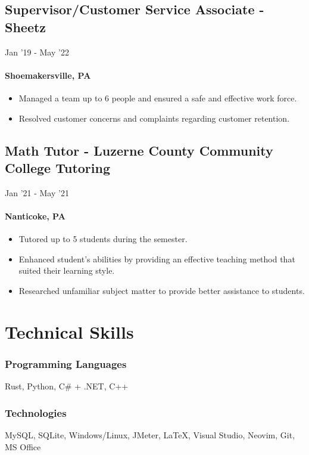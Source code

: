\documentclass{article}
\begin{document}
\subsection{Supervisor/Customer Service Associate - Sheetz} \hfill Jan '19 - May '22
\paragraph{Shoemakersville, PA}
\begin{itemize}
  \item Managed a team up to 6 people and ensured a safe and effective work force.
  \item Resolved customer concerns and complaints regarding customer retention.
\end{itemize}

\subsection{Math Tutor - Luzerne County Community College Tutoring} \hfill Jan '21 - May '21
\paragraph{Nanticoke, PA}
\begin{itemize}
  \item Tutored up to 5 students during the semester.
  \item Enhanced student’s abilities by providing an effective teaching method that suited their learning style.
  \item Researched unfamiliar subject matter to provide better assistance to students.
\end{itemize}

\section{Technical Skills}

\subsubsection{Programming Languages} Rust, Python, C\# + .NET, C++

\subsubsection{Technologies} MySQL, SQLite, Windows/Linux, JMeter, {\LaTeX}, Visual Studio, Neovim, Git, MS Office
\end{document}
